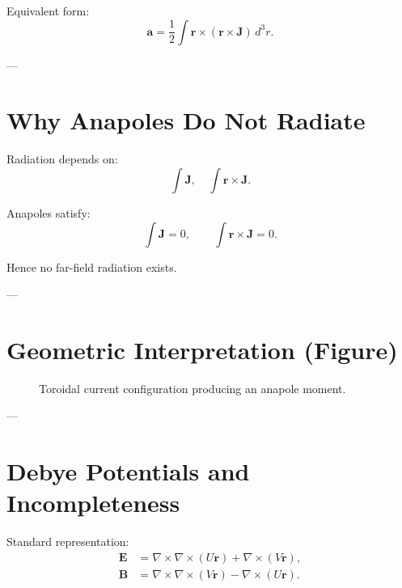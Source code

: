 \documentclass[11pt]{article}
\begin{document}
Equivalent form:
\[
\mathbf{a} = \frac12 \int \mathbf{r} \times (\mathbf{r} \times \mathbf{J})\, d^3r.
\]

---

\section{Why Anapoles Do Not Radiate}

Radiation depends on:
\[
\int \mathbf{J}, \quad \int \mathbf{r}\times\mathbf{J}.
\]

Anapoles satisfy:
\[
\int \mathbf{J} = 0, \qquad \int \mathbf{r}\times\mathbf{J} = 0.
\]

Hence no far-field radiation exists.

---

\section{Geometric Interpretation (Figure)}

\begin{figure}[h!]
\centering
{}
\caption{Toroidal current configuration producing an anapole moment.}
\end{figure}

---

\section{Debye Potentials and Incompleteness}

Standard representation:
\begin{align}
\mathbf{E} &= \nabla\times\nabla\times(U\mathbf{r}) + \nabla\times(V\mathbf{r}), \\
\mathbf{B} &= \nabla\times\nabla\times(V\mathbf{r}) - \nabla\times(U\mathbf{r}).
\end{align}
\end{document}
